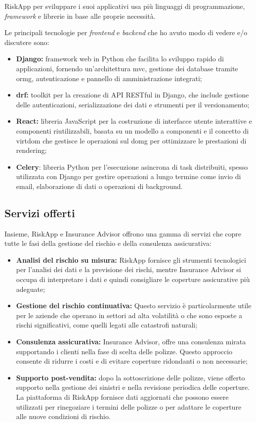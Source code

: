 RiskApp per sviluppare i suoi applicativi usa più linguaggi di programmazione, \textit{framework} e librerie in base alle proprie necessità.

Le principali tecnologie per \textit{frontend} e \textit{backend} che ho avuto modo di vedere e/o discutere sono:
\begin{itemize}
	\item \textbf{Django:} framework web in Python che facilita lo sviluppo rapido di applicazioni, fornendo un'architettura \gls{mvc}, gestione dei database tramite \gls{ormg}, autenticazione e pannello di amministrazione integrati;
	\item \textbf{\gls{drf}:} toolkit per la creazione di API RESTful in Django, che include gestione delle autenticazioni, serializzazione dei dati e strumenti per il versionamento;
	\item \textbf{React:} libreria JavaScript per la costruzione di interfacce utente interattive e componenti riutilizzabili, basata su un modello a componenti e il concetto di \gls{virtdom} che gestisce le operazioni sul \gls{domg} per ottimizzare le prestazioni di rendering;
	\item  \textbf{Celery}: libreria Python per l'esecuzione asincrona di task distribuiti, spesso utilizzata con Django per gestire operazioni a lungo termine come invio di email, elaborazione di dati o operazioni di background.
\end{itemize} 

\subsection{Servizi offerti}
Insieme, RiskApp e Insurance Advisor offrono una gamma di servizi che copre tutte le fasi della gestione del rischio e della consulenza assicurativa:
\begin{itemize}
	\item \textbf{Analisi del rischio su misura:} RiskApp fornisce gli strumenti tecnologici per l'analisi dei dati e la previsione dei rischi, mentre Insurance Advisor si occupa di interpretare i dati e quindi consigliare le coperture assicurative più adeguate;
	\item \textbf{Gestione del rischio continuativa:} Questo servizio è particolarmente utile per le aziende che operano in settori ad alta volatilità o che sono esposte a rischi significativi, come quelli legati alle catastrofi naturali;
	\item \textbf{Consulenza assicurativa:} Insurance Advisor, offre una consulenza mirata supportando i clienti nella fase di scelta delle polizze. Questo approccio consente di ridurre i costi e di evitare coperture ridondanti o non necessarie;
	\item \textbf{Supporto post-vendita:} dopo la sottoscrizione delle polizze, viene offerto supporto nella gestione dei sinistri e nella revisione periodica delle coperture. La piattaforma di RiskApp fornisce dati aggiornati che possono essere utilizzati per rinegoziare i termini delle polizze o per adattare le coperture alle nuove condizioni di rischio.
\end{itemize}

